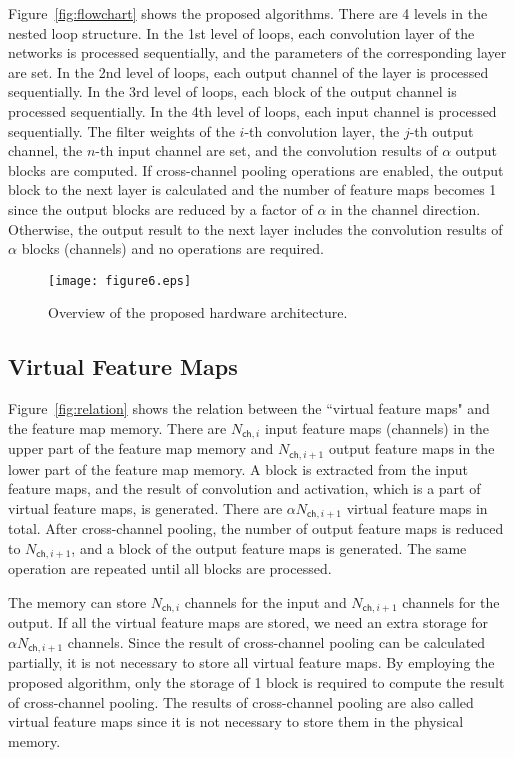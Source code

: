 \documentclass[10pt,twocolumn,letterpaper]{article}
\begin{document}
Figure~\ref{fig:flowchart} shows the proposed algorithms. There are 4 levels in the nested loop structure. In the 1st level of loops, each convolution layer of the networks is processed sequentially, and the parameters of the corresponding layer are set. In the 2nd level of loops, each output channel of the layer is processed sequentially. In the 3rd level of loops, each block of the output channel is processed sequentially. In the 4th level of loops, each input channel is processed sequentially. The filter weights of the $i$-th convolution layer, the $j$-th output channel, the $n$-th input channel are set, and the convolution results of $\alpha$ output blocks are computed. If cross-channel pooling operations are enabled, the output block to the next layer is calculated and the number of feature maps becomes 1 since the output blocks are reduced by a factor of $\alpha$ in the channel direction. Otherwise, the output result to the next layer includes the convolution results of $\alpha$ blocks (channels) and no operations are required.

\begin{figure*}[t]
\begin{center}
\texttt{[image: figure6.eps]}
\end{center}
   \caption{Overview of the proposed hardware architecture.}
\label{fig:architecture}
\end{figure*}


\subsection{Virtual Feature Maps}
\label{subsec:vitrual}

Figure~\ref{fig:relation} shows the relation between the ``virtual feature maps" and the feature map memory. There are $N_{\mathsf{ch},i}$ input feature maps (channels) in the upper part of the feature map memory and $N_{\mathsf{ch},i+1}$ output feature maps in the lower part of the feature map memory. A block is extracted from the input feature maps, and the result of convolution and activation, which is a part of virtual feature maps, is generated. There are $\alpha N_{\mathsf{ch},i+1}$ virtual feature maps in total. After cross-channel pooling, the number of output feature maps is reduced to $N_{\mathsf{ch},i+1}$, and a block of the output feature maps is generated. The same operation are repeated until all blocks are processed.

The memory can store $N_{\mathsf{ch},i}$ channels for the input and $N_{\mathsf{ch},i+1}$ channels for the output. If all the virtual feature maps are stored, we need an extra storage for $\alpha  N_{\mathsf{ch},i+1}$ channels. Since the result of cross-channel pooling can be calculated partially, it is not necessary to store all virtual feature maps. By employing the proposed algorithm, only the storage of 1 block is required to compute the result of cross-channel pooling. The results of cross-channel pooling are also called virtual feature maps since it is not necessary to store them in the physical memory.
\end{document}
